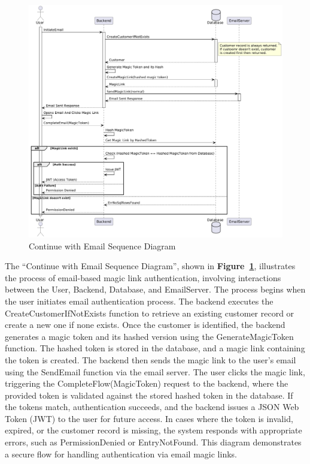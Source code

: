 \begin{figure}[!h]
  \centering
  \includegraphics[width=\textwidth]{images/docs/diagrams/sequence-diagrams/all-sequence-diagrams/Continue with Email.png}
  \caption{Continue with Email Sequence Diagram}
  \label{fig:seq/continue-with-email}
\end{figure}

The ``Continue with Email Sequence Diagram'', shown in \textbf{Figure~\ref{fig:seq/continue-with-email}}, illustrates the process of email-based magic link authentication, involving interactions between the User, Backend, Database, and EmailServer. The process begins when the user initiates email authentication process. The backend executes the CreateCustomerIfNotExists function to retrieve an existing customer record or create a new one if none exists. Once the customer is identified, the backend generates a magic token and its hashed version using the GenerateMagicToken function. The hashed token is stored in the database, and a magic link containing the token is created. The backend then sends the magic link to the user's email using the SendEmail function via the email server. The user clicks the magic link, triggering the CompleteFlow(MagicToken) request to the backend, where the provided token is validated against the stored hashed token in the database. If the tokens match, authentication succeeds, and the backend issues a JSON Web Token (JWT) to the user for future access. In cases where the token is invalid, expired, or the customer record is missing, the system responds with appropriate errors, such as PermissionDenied or EntryNotFound. This diagram demonstrates a secure flow for handling authentication via email magic links.